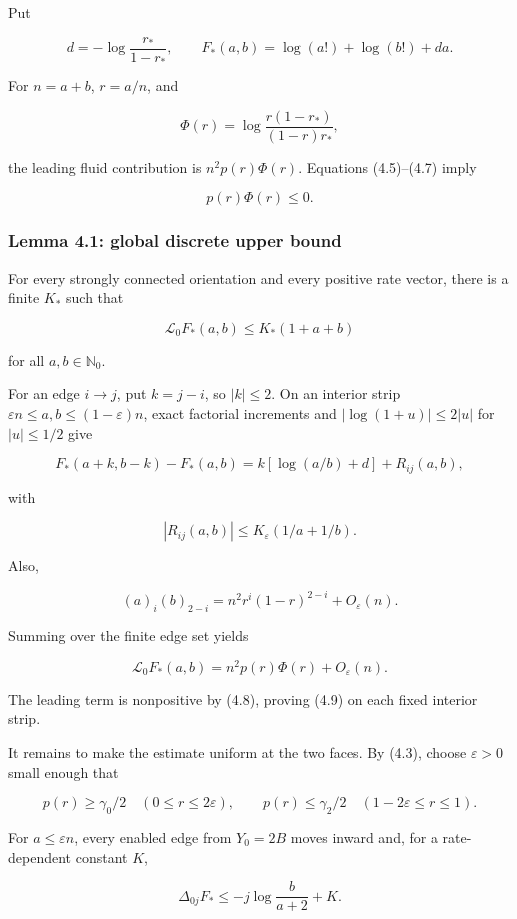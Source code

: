 Put

\[
 d=-\log\frac{r_*}{1-r_*},\qquad
 F_*(a,b)=\log(a!)+\log(b!)+da.
\tag{4.6}
\]

For \(n=a+b\), \(r=a/n\), and

\[
 \Phi(r)=\log\frac{r(1-r_*)}{(1-r)r_*},
\tag{4.7}
\]

the leading fluid contribution is \(n^2p(r)\Phi(r)\). Equations
(4.5)--(4.7) imply

\[
 p(r)\Phi(r)\le0.
\tag{4.8}
\]

\subsubsection{Lemma 4.1: global discrete upper
bound}

For every strongly connected orientation and every positive rate vector,
there is a finite \(K_*\) such that

\[
 \mathcal L_0F_*(a,b)\le K_*(1+a+b)
\tag{4.9}
\]

for all \(a,b\in\mathbb N_0\).

For an edge \(i\to j\), put \(k=j-i\), so \(|k|\le2\). On an interior
strip \(\varepsilon n\le a,b\le(1-\varepsilon)n\), exact factorial
increments and \(|\log(1+u)|\le2|u|\) for \(|u|\le1/2\) give

\[
 F_*(a+k,b-k)-F_*(a,b)
 =k[\log(a/b)+d]+R_{ij}(a,b),
\tag{4.10}
\]

with

\[
 |R_{ij}(a,b)|\le K_\varepsilon(1/a+1/b).
\tag{4.11}
\]

Also,

\[
 (a)_i(b)_{2-i}
 =n^2r^i(1-r)^{2-i}+O_\varepsilon(n).
\tag{4.12}
\]

Summing over the finite edge set yields

\[
 \mathcal L_0F_*(a,b)
 =n^2p(r)\Phi(r)+O_\varepsilon(n).
\tag{4.13}
\]

The leading term is nonpositive by (4.8), proving (4.9) on each fixed
interior strip.

It remains to make the estimate uniform at the two faces. By (4.3),
choose \(\varepsilon>0\) small enough that

\[
 p(r)\ge\gamma_0/2\quad(0\le r\le2\varepsilon),\qquad
 p(r)\le\gamma_2/2\quad(1-2\varepsilon\le r\le1).
\tag{4.14}
\]

For \(a\le\varepsilon n\), every enabled edge from \(Y_0=2B\) moves
inward and, for a rate-dependent constant \(K\),

\[
 \Delta_{0j}F_*
 \le-j\log\frac{b}{a+2}+K.
\tag{4.15}
\]

